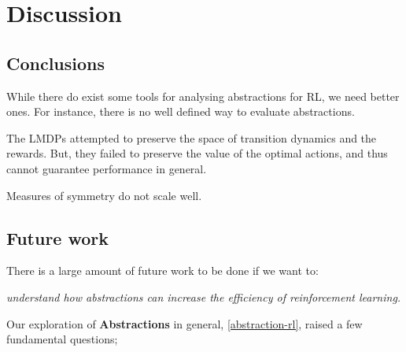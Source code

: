 \chapter{Discussion}\label{C:con}

\section{Conclusions}

While there do exist some tools for analysing abstractions for RL, we need better ones.
For instance, there is no well defined way to evaluate abstractions.

The LMDPs attempted to preserve the space of transition dynamics and the rewards. But, they failed to preserve the value of the optimal actions, and thus cannot guarantee performance in general.

Measures of symmetry do not scale well.

\section{Future work}

There is a large amount of future work to be done if we want to:

\begin{displayquote}
\textit{understand how abstractions can increase the efficiency of reinforcement learning.}
\end{displayquote}

Our exploration of \textbf{Abstractions} in general, \ref{abstraction-rl}, raised a few fundamental questions;

